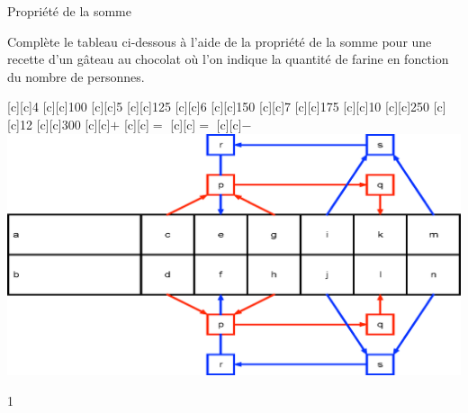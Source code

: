 \documentclass[a4paper,11pt]{report}
\begin{document}
\begin{resolu}{Propriété de la somme}{Complète le tableau ci-dessous à l'aide de la propriété de la somme pour une recette d'un gâteau au chocolat où l'on indique la quantité de farine en fonction du nombre de personnes.

\vspace*{1cm}
\begin{center}
[c][c]{4}
[c][c]{100}
[c][c]{\color{blue}5}
[c][c]{125}
[c][c]{6}
[c][c]{150}
[c][c]{7}
[c][c]{175}
[c][c]{10}
[c][c]{\color{red}250}
[c][c]{12}
[c][c]{300}
[c][c]{\color{red}$+$}
[c][c]{\color{red}$=$}
[c][c]{\color{blue}$=$}
[c][c]{\color{blue}$-$}
\includegraphics[scale=.9]{media/fa-30/tableauaddn.eps}
\end{center}
\vspace*{1cm}
}{1}
\end{resolu}
\end{document}
